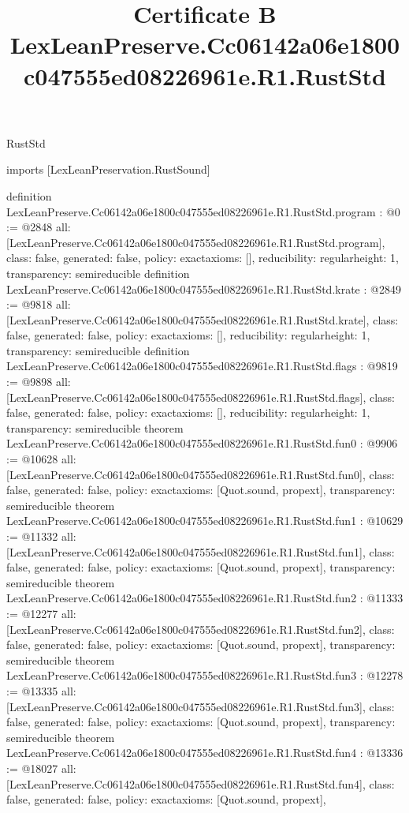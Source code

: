 \begin{lexlean}{RustStd}
\title{Certificate B LexLeanPreserve.Cc06142a06e1800c047555ed08226961e.R1.RustStd}
\begin{coremodule}
imports [LexLeanPreservation.RustSound]

definition LexLeanPreserve.Cc06142a06e1800c047555ed08226961e.R1.RustStd.program : @0 := @2848 {
  all: [LexLeanPreserve.Cc06142a06e1800c047555ed08226961e.R1.RustStd.program],
  class: false,
  generated: false,
  policy: exact{axioms: []},
  reducibility: regular{height: 1},
  transparency: semireducible
}
definition LexLeanPreserve.Cc06142a06e1800c047555ed08226961e.R1.RustStd.krate : @2849 := @9818 {
  all: [LexLeanPreserve.Cc06142a06e1800c047555ed08226961e.R1.RustStd.krate],
  class: false,
  generated: false,
  policy: exact{axioms: []},
  reducibility: regular{height: 1},
  transparency: semireducible
}
definition LexLeanPreserve.Cc06142a06e1800c047555ed08226961e.R1.RustStd.flags : @9819 := @9898 {
  all: [LexLeanPreserve.Cc06142a06e1800c047555ed08226961e.R1.RustStd.flags],
  class: false,
  generated: false,
  policy: exact{axioms: []},
  reducibility: regular{height: 1},
  transparency: semireducible
}
theorem LexLeanPreserve.Cc06142a06e1800c047555ed08226961e.R1.RustStd.fun0 : @9906 := @10628 {
  all: [LexLeanPreserve.Cc06142a06e1800c047555ed08226961e.R1.RustStd.fun0],
  class: false,
  generated: false,
  policy: exact{axioms: [Quot.sound, propext]},
  transparency: semireducible
}
theorem LexLeanPreserve.Cc06142a06e1800c047555ed08226961e.R1.RustStd.fun1 : @10629 := @11332 {
  all: [LexLeanPreserve.Cc06142a06e1800c047555ed08226961e.R1.RustStd.fun1],
  class: false,
  generated: false,
  policy: exact{axioms: [Quot.sound, propext]},
  transparency: semireducible
}
theorem LexLeanPreserve.Cc06142a06e1800c047555ed08226961e.R1.RustStd.fun2 : @11333 := @12277 {
  all: [LexLeanPreserve.Cc06142a06e1800c047555ed08226961e.R1.RustStd.fun2],
  class: false,
  generated: false,
  policy: exact{axioms: [Quot.sound, propext]},
  transparency: semireducible
}
theorem LexLeanPreserve.Cc06142a06e1800c047555ed08226961e.R1.RustStd.fun3 : @12278 := @13335 {
  all: [LexLeanPreserve.Cc06142a06e1800c047555ed08226961e.R1.RustStd.fun3],
  class: false,
  generated: false,
  policy: exact{axioms: [Quot.sound, propext]},
  transparency: semireducible
}
theorem LexLeanPreserve.Cc06142a06e1800c047555ed08226961e.R1.RustStd.fun4 : @13336 := @18027 {
  all: [LexLeanPreserve.Cc06142a06e1800c047555ed08226961e.R1.RustStd.fun4],
  class: false,
  generated: false,
  policy: exact{axioms: [Quot.sound, propext]},
}
\end{coremodule}
\end{lexlean}
